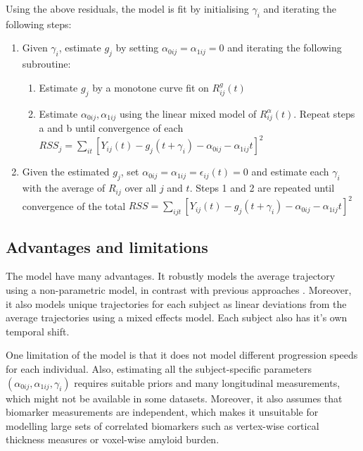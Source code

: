 Using the above residuals, the model is fit by initialising $\gamma_i$ and iterating the following steps\cite{donohue2014estimating}:
\begin{enumerate}
 \item Given $\gamma_i$, estimate $g_j$ by setting $\alpha_{0ij} = \alpha_{1ij} = 0$ and iterating the following subroutine:
 \begin{enumerate}
  \item Estimate $g_j$ by a monotone curve fit on $R_{ij}^g(t)$
  \item Estimate $\alpha_{0ij}, \alpha_{1ij}$ using the linear mixed model of $R_{ij}^{\alpha}(t)$. Repeat steps a and b until convergence of each $RSS_j = \sum_{it} \left[ Y_{ij}(t)-g_j(t+\gamma_i)-\alpha_{0ij}-\alpha_{1ij}t \right]^2 $
 \end{enumerate}
 
 \item Given the estimated $g_j$, set $\alpha_{0ij} = \alpha_{1ij} = \epsilon_{ij}(t) = 0$ and estimate each $\gamma_i$ with the average of $R_{ij}$ over all $j$ and $t$. Steps 1 and 2 are repeated until convergence of the total $RSS = \sum_{ijt} \left[ Y_{ij}(t)-g_j(t+\gamma_i)-\alpha_{0ij}-\alpha_{1ij}t \right]^2 $

\end{enumerate}

\subsection{Advantages and limitations}

The model have many advantages. It robustly models the average trajectory using a non-parametric model, in contrast with previous approaches \cite{jedynak2012computational}. Moreover, it also models unique trajectories for each subject as linear deviations from the average trajectories using a mixed effects model. Each subject also has it's own temporal shift. 

One limitation of the model is that it does not model different progression speeds for each individual. Also, estimating all the subject-specific parameters $(\alpha_{0ij}, \alpha_{1ij}, \gamma_i)$ requires suitable priors and many longitudinal measurements, which might not be available in some datasets. Moreover, it also assumes that biomarker measurements are independent, which makes it unsuitable for modelling large sets of correlated biomarkers such as vertex-wise cortical thickness measures or voxel-wise amyloid burden. 

